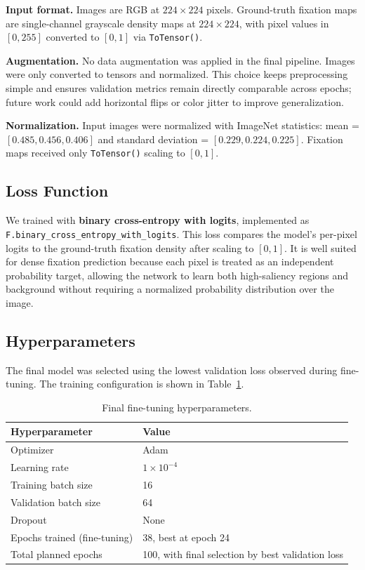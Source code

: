 \documentclass[conference]{IEEEtran}
\begin{document}
\textbf{Input format.} Images are RGB at $224\times224$ pixels. Ground-truth fixation maps are single-channel grayscale density maps at $224\times224$, with pixel values in $[0,255]$ converted to $[0,1]$ via \texttt{ToTensor()}.

\textbf{Augmentation.} No data augmentation was applied in the final pipeline. Images were only converted to tensors and normalized. This choice keeps preprocessing simple and ensures validation metrics remain directly comparable across epochs; future work could add horizontal flips or color jitter to improve generalization.

\textbf{Normalization.} Input images were normalized with ImageNet statistics: mean = $[0.485, 0.456, 0.406]$ and standard deviation = $[0.229, 0.224, 0.225]$. Fixation maps received only \texttt{ToTensor()} scaling to $[0,1]$.

\subsection{Loss Function}
We trained with \textbf{binary cross-entropy with logits}, implemented as \texttt{F.binary\_cross\_entropy\_with\_logits}. This loss compares the model's per-pixel logits to the ground-truth fixation density after scaling to $[0,1]$. It is well suited for dense fixation prediction because each pixel is treated as an independent probability target, allowing the network to learn both high-saliency regions and background without requiring a normalized probability distribution over the image.

\subsection{Hyperparameters}
The final model was selected using the lowest validation loss observed during fine-tuning. The training configuration is shown in Table~\ref{tab:hyperparameters}.

\begin{table}[H]
\centering
\small
\renewcommand{\arraystretch}{1.1}
\begin{tabularx}{\linewidth}{@{}l X@{}}
\toprule
\textbf{Hyperparameter} & \textbf{Value} \\
\midrule
Optimizer & Adam \\
Learning rate & $1\times10^{-4}$ \\
Training batch size & 16 \\
Validation batch size & 64 \\
Dropout & None \\
Epochs trained (fine-tuning) & 38, best at epoch 24 \\
Total planned epochs & 100, with final selection by best validation loss \\
\bottomrule
\end{tabularx}
\caption{Final fine-tuning hyperparameters.}
\label{tab:hyperparameters}
\end{table}
\end{document}
